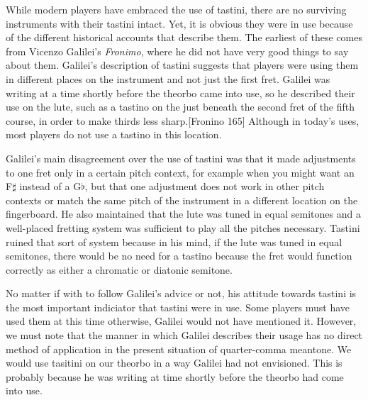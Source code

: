 While modern players have embraced the use of tastini, there are no surviving instruments
with their tastini intact.  Yet, it is obvious they were in use because of the different
historical accounts that describe them.  The earliest of these comes from Vicenzo
Galilei's \textit{Fronimo}, where he did not have very good things to say about them.
Galilei's description of tastini suggests that players were using them in different places
on the instrument and not just the first fret.  Galilei was writing at a time shortly
before the theorbo came into use, so he described their use on the lute, such as a tastino
on the just beneath the second fret of the fifth course, in order to make thirds less
sharp.[Fronino 165]  Although in today's uses, most players do not use a tastino in this
location.

Galilei's main disagreement over the use of tastini was that it made adjustments to one
fret only in a certain pitch context, for example when you might want an F$\sharp$ instead
of a G$\flat$, but that one adjustment does not work in other pitch contexts or match the
same pitch of the instrument in a different location on the fingerboard.  He also
maintained that the lute was tuned in equal semitones and a well-placed fretting system
was sufficient to play all the pitches necessary. Tastini ruined that sort of system
because in his mind, if the lute was tuned in equal semitones, there would be no need for
a tastino because the fret would function correctly as either a chromatic or diatonic
semitone.

No matter if with to follow Galilei's advice or not, his attitude towards tastini is the
most important indiciator that tastini were in use.  Some players must have used them at
this time otherwise, Galilei would not have mentioned it.  However, we must note that the
manner in which Galilei describes their usage has no direct method of application in the
present situation of quarter-comma meantone.  We would use tasitini on our theorbo in a
way Galilei had not envisioned.  This is probably because he was writing at time shortly
before the theorbo had come into use.

